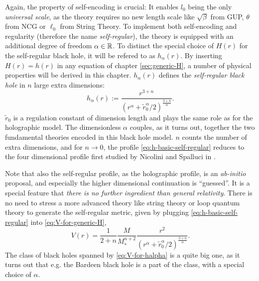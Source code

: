 \documentclass[12pt,a4paper]{report}
\numberwithin{equation}{chapter}
\begin{document}
Again, the property of self-encoding is crucial: It enables $l_0$ being the only \emph{universal scale}, as the theory requires no new length scale like $\sqrt{\beta}$ from GUP, $\theta$ from NCG or $\ell_0$ from String Theory. To implement both self-encoding and regularity (therefore the name \emph{self-regular}), the theory is equipped with an additional degree of freedom $\alpha \in \mathbb{R}$. To distinct the special choice of $H(r)$ for the self-regular black hole, it will be refered to as $h_\alpha(r)$. By inserting $H(r)=h(r)$ in any equation of chapter \ref{sec:generic-H}, a number of physical properties will be derived in this chapter. $h_\alpha(r)$ defines the \emph{self-regular black hole} in $n$ large extra dimensions:
\begin{equation}\label{eq:h-basic-self-regular}
h_\alpha(r) := \frac{r^{3+n}}{
\left( r^\alpha + \tilde r_0^\alpha / 2 \right)^{\frac{3+n}\alpha}
}.
\end{equation}
$\tilde r_0$ is a regulation constant of dimension length and plays the same role as for the holographic model. The dimensionless $\alpha$ couples, as it turns out, together the two fundamental theories encoded in this black hole model. $n$ counts the number of extra dimensions, and for $n\to 0$, the profile \eqref{eq:h-basic-self-regular} reduces to the four dimensional profile first studied by Nicolini and Spalluci in \cite{NS2012}.

Note that also the self-regular profile, as the holographic profile, is an \emph{ab-initio} proposal, and especially the higher dimensional continuation is ``guessed''. It is a special feature that \emph{there is no further ingredient than general relativity}. There is no need to stress a more advanced theory like string theory or loop quantum theory to generate the self-regular metric, given by plugging \eqref{eq:h-basic-self-regular} into \eqref{eq:V-for-generic-H},
\begin{equation}\label{eq:V-for-halpha}
V(r) = \frac{1}{2+n} \frac{M}{M_*^{n+2}} 
\frac{r^2}{\left( r^\alpha + \tilde r_0^\alpha / 2 \right)^{\frac{3+n}\alpha}}.
\end{equation}
The class of black holes spanned by \eqref{eq:V-for-halpha} is a quite big one, as it turns out that e.g. the Bardeen black hole \cite{bardeen} is a part of the class, with a special choice of $\alpha$.
\end{document}
